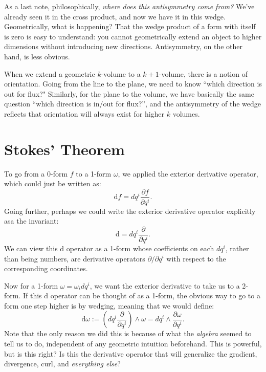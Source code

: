 	As a last note, philosophically, \emph{where does this antisymmetry come from?} We've already seen it in the cross product, and now we have it in this wedge. Geometrically, what is happening? That the wedge product of a form with itself is zero is easy to understand: you cannot geometrically extend an object to higher dimensions without introducing new directions. Antisymmetry, on the other hand, is less obvious.
	
	 When we extend a geometric $k$-volume to a $k+1$-volume, there is a notion of orientation. Going from the line to the plane, we need to know ``which direction is out for flux?" Similarly, for the plane to the volume, we have basically the same question ``which direction is in/out for flux?'', and the antisymmetry of the wedge reflects that orientation will always exist for higher $k$ volumes.
	
	
	\section{Stokes' Theorem} %
	\label{sec:stokes_theorem}
	
	
	To go from a 0-form $f$ to a 1-form $\omega$, we applied the exterior derivative operator, which could just be written as:
	\begin{equation}
		\mathrm df = dq^i \frac{\partial f}{\partial q^i}.
	\end{equation}
	Going further, perhaps we could write the exterior derivative operator explicitly asa the invariant: 
	\begin{equation}\label{eq:exterior_derivative}
		\mathrm d = dq^i \frac{\partial}{\partial q^i}.
	\end{equation}
	We can view this $\mathrm d$ operator as a 1-form whose coefficients on each $dq^i$, rather than being numbers, are derivative operators $\partial/\partial q^i$ with respect to the corresponding coordinates. 
	
	Now for a 1-form $\omega = \omega_i dq^i$, we want the exterior derivative to take us to a 2-form. If this $\mathrm d$ operator can be thought of as a 1-form, the obvious way to go to a form one step higher is by wedging, meaning that we would define:
	\begin{equation}\label{eq:exterior_derivative2}
		\mathrm d \omega := (dq^i \frac{\partial}{\partial q^i}) \wedge \omega= dq^i \wedge \frac{\partial \omega}{\partial q^i}.
	\end{equation}
	Note that the only reason we did this is because of what the \emph{algebra} seemed to tell us to do, independent of any geometric intuition beforehand. This is powerful, but is this right? Is this the derivative operator that will generalize the gradient, divergence, curl, and \emph{everything else}?
	
